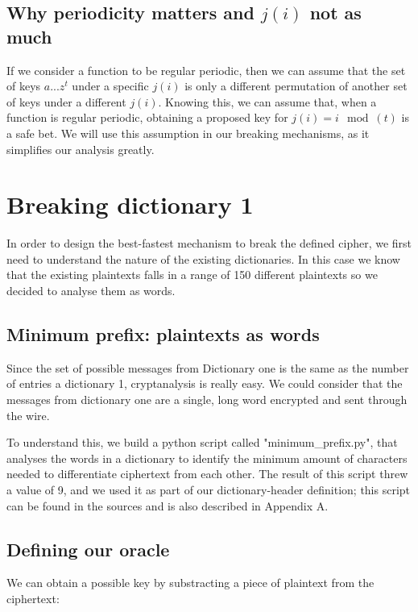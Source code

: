 \documentclass[pdftex,12pt,letter]{article}
\begin{document}
\subsection{Why periodicity matters and $j(i)$ not as much}

If we consider a function to be regular periodic, then we can assume that the 
set of keys ${a...z}^t$ under a specific $j(i)$ is only a different permutation
of another set of keys under a different $j(i)$. Knowing this, we can
assume that, when a function is regular periodic, obtaining a proposed key for
$j(i) = i \mod(t)$ is a safe bet. We will use this assumption in our breaking 
mechanisms, as it simplifies our analysis greatly.

\section{Breaking dictionary 1}

In order to design the best-fastest mechanism to break the defined cipher, we 
first need to understand the nature of the existing dictionaries. In this case
we know that the existing plaintexts falls in a range of 150 different plaintexts
so we decided to analyse them as words.

\subsection{Minimum prefix: plaintexts as words}

Since the set of possible messages from Dictionary one is the same as the number of 
entries a dictionary 1, cryptanalysis is really easy. We could consider that the 
messages from dictionary one are a single, long word encrypted and sent through the wire.

To understand this, we build a python script called "minimum\_prefix.py", that analyses the 
words in a dictionary to identify the minimum amount of characters needed to differentiate
ciphertext from each other. The result of this script threw a value of 9, and we used it
as part of our dictionary-header definition; this script can be found in the sources
and is also described in Appendix A.

\subsection{Defining our oracle}

We can obtain a possible key by substracting a piece of plaintext from the ciphertext:
\end{document}
